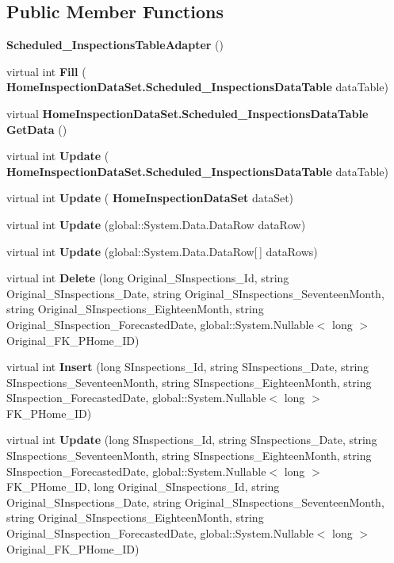 \subsection*{Public Member Functions}
\begin{DoxyCompactItemize}
\item 
\textbf{ Scheduled\+\_\+\+Inspections\+Table\+Adapter} ()
\item 
virtual int \textbf{ Fill} (\textbf{ Home\+Inspection\+Data\+Set.\+Scheduled\+\_\+\+Inspections\+Data\+Table} data\+Table)
\item 
virtual \textbf{ Home\+Inspection\+Data\+Set.\+Scheduled\+\_\+\+Inspections\+Data\+Table} \textbf{ Get\+Data} ()
\item 
virtual int \textbf{ Update} (\textbf{ Home\+Inspection\+Data\+Set.\+Scheduled\+\_\+\+Inspections\+Data\+Table} data\+Table)
\item 
virtual int \textbf{ Update} (\textbf{ Home\+Inspection\+Data\+Set} data\+Set)
\item 
virtual int \textbf{ Update} (global\+::\+System.\+Data.\+Data\+Row data\+Row)
\item 
virtual int \textbf{ Update} (global\+::\+System.\+Data.\+Data\+Row[$\,$] data\+Rows)
\item 
virtual int \textbf{ Delete} (long Original\+\_\+\+S\+Inspections\+\_\+\+Id, string Original\+\_\+\+S\+Inspections\+\_\+\+Date, string Original\+\_\+\+S\+Inspections\+\_\+\+Seventeen\+Month, string Original\+\_\+\+S\+Inspections\+\_\+\+Eighteen\+Month, string Original\+\_\+\+S\+Inspection\+\_\+\+Forecasted\+Date, global\+::\+System.\+Nullable$<$ long $>$ Original\+\_\+\+F\+K\+\_\+\+P\+Home\+\_\+\+ID)
\item 
virtual int \textbf{ Insert} (long S\+Inspections\+\_\+\+Id, string S\+Inspections\+\_\+\+Date, string S\+Inspections\+\_\+\+Seventeen\+Month, string S\+Inspections\+\_\+\+Eighteen\+Month, string S\+Inspection\+\_\+\+Forecasted\+Date, global\+::\+System.\+Nullable$<$ long $>$ F\+K\+\_\+\+P\+Home\+\_\+\+ID)
\item 
virtual int \textbf{ Update} (long S\+Inspections\+\_\+\+Id, string S\+Inspections\+\_\+\+Date, string S\+Inspections\+\_\+\+Seventeen\+Month, string S\+Inspections\+\_\+\+Eighteen\+Month, string S\+Inspection\+\_\+\+Forecasted\+Date, global\+::\+System.\+Nullable$<$ long $>$ F\+K\+\_\+\+P\+Home\+\_\+\+ID, long Original\+\_\+\+S\+Inspections\+\_\+\+Id, string Original\+\_\+\+S\+Inspections\+\_\+\+Date, string Original\+\_\+\+S\+Inspections\+\_\+\+Seventeen\+Month, string Original\+\_\+\+S\+Inspections\+\_\+\+Eighteen\+Month, string Original\+\_\+\+S\+Inspection\+\_\+\+Forecasted\+Date, global\+::\+System.\+Nullable$<$ long $>$ Original\+\_\+\+F\+K\+\_\+\+P\+Home\+\_\+\+ID)

\end{DoxyCompactItemize}
